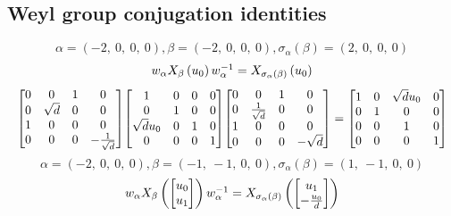 \documentclass[11pt]{article}
\theoremstyle{definition}
\begin{document}
\subsection{Weyl group conjugation identities}

\providecommand{\scaletoalign}[2]{%
  \sbox0{$#2$}%
  \ifdim\wd0>#1\relax 
    \resizebox{#1}{!}{\usebox0}%
  \else 
    \usebox0%
  \fi 
}
\[
\alpha = \left( -2, \  0, \  0, \  0\right), \beta = \left( -2, \  0, \  0, \  0\right), \sigma_{\alpha}(\beta) = \left( 2, \  0, \  0, \  0\right)
\]
\[
\scaletoalign{\textwidth}{w_{\alpha} X_{\beta}\left(u_{0}\right) w_{\alpha}^{-1} = X_{\sigma_{\alpha}\left(\beta\right)}\left(u_{0}\right)}
\]
\[
\scaletoalign{\textwidth}{{\left[\begin{matrix}0 & 0 & 1 & 0\\0 & \sqrt{d} & 0 & 0\\1 & 0 & 0 & 0\\0 & 0 & 0 & - \frac{1}{\sqrt{d}}\end{matrix}\right]} {\left[\begin{matrix}1 & 0 & 0 & 0\\0 & 1 & 0 & 0\\\sqrt{d} u_{0} & 0 & 1 & 0\\0 & 0 & 0 & 1\end{matrix}\right]} {\left[\begin{matrix}0 & 0 & 1 & 0\\0 & \frac{1}{\sqrt{d}} & 0 & 0\\1 & 0 & 0 & 0\\0 & 0 & 0 & - \sqrt{d}\end{matrix}\right]} = {\left[\begin{matrix}1 & 0 & \sqrt{d} u_{0} & 0\\0 & 1 & 0 & 0\\0 & 0 & 1 & 0\\0 & 0 & 0 & 1\end{matrix}\right]}}
\]
\[
\alpha = \left( -2, \  0, \  0, \  0\right), \beta = \left( -1, \  -1, \  0, \  0\right), \sigma_{\alpha}(\beta) = \left( 1, \  -1, \  0, \  0\right)
\]
\[
\scaletoalign{\textwidth}{w_{\alpha} X_{\beta}\left(\left[\begin{matrix}u_{0}\\u_{1}\end{matrix}\right]\right) w_{\alpha}^{-1} = X_{\sigma_{\alpha}\left(\beta\right)}\left(\left[\begin{matrix}u_{1}\\- \frac{u_{0}}{d}\end{matrix}\right]\right)}
\]
\end{document}

